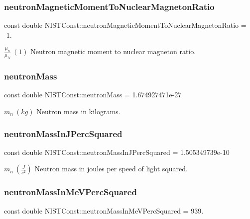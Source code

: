 \subsubsection{\texorpdfstring{neutron\+Magnetic\+Moment\+To\+Nuclear\+Magneton\+Ratio}{neutronMagneticMomentToNuclearMagnetonRatio}}
{\footnotesize\ttfamily const double N\+I\+S\+T\+Const\+::neutron\+Magnetic\+Moment\+To\+Nuclear\+Magneton\+Ratio = -\/1.}

$\frac{\mu_n}{\mu_N} \ (1)$ Neutron magnetic moment to nuclear magneton ratio. \mbox{\label{group___neutron_ga74edcc04e59f152b2afa0fdba8683383}} 
\subsubsection{\texorpdfstring{neutron\+Mass}{neutronMass}}
{\footnotesize\ttfamily const double N\+I\+S\+T\+Const\+::neutron\+Mass = 1.\+674927471e-\/27}

$m_n \ (kg)$ Neutron mass in kilograms. \mbox{\label{group___neutron_ga28892913d6ed40673a170941f79bb86e}} 
\subsubsection{\texorpdfstring{neutron\+Mass\+In\+J\+Perc\+Squared}{neutronMassInJPercSquared}}
{\footnotesize\ttfamily const double N\+I\+S\+T\+Const\+::neutron\+Mass\+In\+J\+Perc\+Squared = 1.\+505349739e-\/10}

$m_n \ (\frac{J}{c^2})$ Neutron mass in joules per speed of light squared. \mbox{\label{group___neutron_ga53f986a22e4dcb31cc8ed8151fd18a8e}} 
\subsubsection{\texorpdfstring{neutron\+Mass\+In\+Me\+V\+Perc\+Squared}{neutronMassInMeVPercSquared}}
{\footnotesize\ttfamily const double N\+I\+S\+T\+Const\+::neutron\+Mass\+In\+Me\+V\+Perc\+Squared = 939.}

